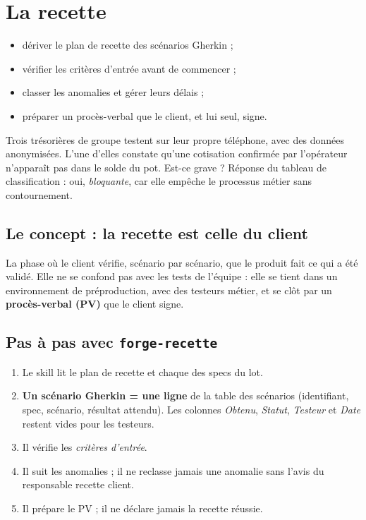 \chapter{La recette}\label{ch:recette}

\begin{objectifs}
\begin{itemize}
  \item dériver le plan de recette des scénarios Gherkin ;
  \item vérifier les critères d'entrée avant de commencer ;
  \item classer les anomalies et gérer leurs délais ;
  \item préparer un procès-verbal que le client, et lui seul, signe.
\end{itemize}
\end{objectifs}

\begin{situation}
Trois trésorières de groupe testent \sika{} sur leur propre téléphone, avec des données anonymisées. L'une d'elles
constate qu'une cotisation confirmée par l'opérateur n'apparaît pas dans le solde du pot. Est-ce grave ?
Réponse du tableau de classification : oui, \emph{bloquante}, car elle empêche le processus métier sans contournement.
\end{situation}

\section{Le concept : la recette est celle du client}
\begin{concept}[Recette]
La phase où le client vérifie, scénario par scénario, que le produit fait ce qui a été validé. Elle ne se confond pas avec
les tests de l'équipe : elle se tient dans un environnement de préproduction, avec des testeurs métier, et se clôt par un
\textbf{procès-verbal (PV)} que le client signe.
\end{concept}

\section{Pas à pas avec \texttt{forge-recette}}
\begin{enumerate}
  \item Le skill lit le plan de recette et chaque  des specs du lot.
  \item \textbf{Un scénario Gherkin = une ligne} de la table des scénarios (identifiant, spec, scénario, résultat attendu). Les colonnes \emph{Obtenu}, \emph{Statut}, \emph{Testeur} et \emph{Date} restent vides pour les testeurs.
  \item Il vérifie les \emph{critères d'entrée}.
  \item Il suit les anomalies ; il ne reclasse jamais une anomalie sans l'avis du responsable recette client.
  \item Il prépare le PV ; il ne déclare jamais la recette réussie.
\end{enumerate}

